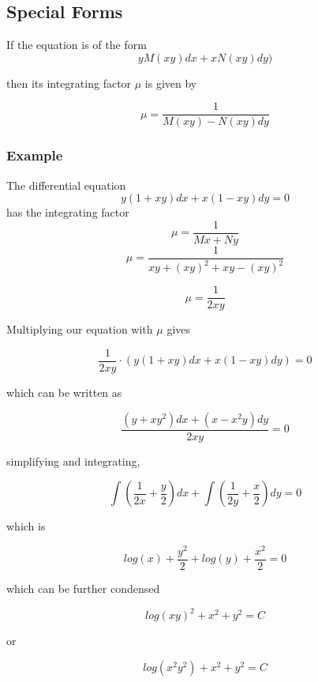 \documentclass{article}
\begin{document}
	\subsection{Special Forms}
	If the equation is of the form $$yM(xy)dx + xN(xy)dy)$$

then its integrating factor $\mu$ is given by

$$ \mu = \frac{1}{M(xy) - N(xy)dy} $$

\subsubsection{Example}
The differential equation
$$ y(1+xy)dx + x(1-xy)dy = 0$$
has the integrating factor
 $$ \mu = \frac{1}{Mx+ Ny} $$
$$\mu = \frac{1}{xy + (xy)^2 + xy - (xy)^2} $$

$$\mu = \frac{1}{2xy} $$

Multiplying our equation with $\mu$ gives

$$\frac{1}{2xy}\cdot \left(y(1+xy)dx + x(1-xy)dy\right) = 0 $$

which can be written as

$$\frac{(y + xy^2)dx + (x - x^2y)dy}{2xy} = 0 $$

simplifying and integrating,


$$ \int(\frac{1}{2x} + \frac{y}{2})dx + \int(\frac{1}{2y} + \frac{x}{2})dy = 0$$

which is

$$log(x) + \frac{y^2}{2} + log(y) + \frac{x^2}{2} = 0 $$

which can be further condensed

$$ log(xy)^2 + x^2 + y^2 = C$$

or 

$$ log(x^2y^2) + x^2 + y^2 = C$$
\end{document}
